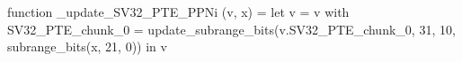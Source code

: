 function _update_SV32_PTE_PPNi (v, x) = let v = { v with SV32_PTE_chunk_0 = update_subrange_bits(v.SV32_PTE_chunk_0, 31, 10, subrange_bits(x, 21, 0)) } in
  v

